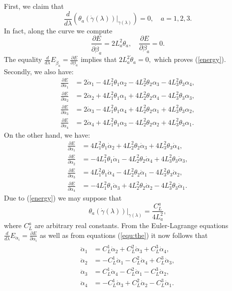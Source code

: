 \documentclass [12pt,a4paper]{amsart}
\theoremstyle{plain}
\theoremstyle{definition}
\numberwithin{equation}{section}
\begin{document}
First, we claim that 
\begin{equation}\label{energy}
\frac{d}{d\lambda}\left(\theta_a(\dot\gamma(\lambda))|_{\gamma(\lambda)}\right)=0,\quad a=1, 2, 3.
\end{equation} 
In fact, along the curve we compute 
$$
\frac{\partial E}{\partial {\dot\beta_{a}}}=2L_a^2\theta_a,\quad \frac{\partial E}{\partial \beta_{a}}=0.
$$
The equality  $\frac{d}{d\lambda}E_ {\dot\beta_{a}}=\frac{\partial E}{\partial \beta_{a}}$ implies that $2L_a^2\dot\theta_a=0,$ which proves (\ref{energy}).
Secondly, we also have:
\begin{align*}
\frac{\partial E}{\partial \dot\alpha_1}&=2\dot\alpha_1-4L_1^2\theta_1\alpha_2-4L_2^2\theta_2\alpha_3-4L_3^2\theta_3\alpha_4,\\
\frac{\partial E}{\partial \dot\alpha_2}&=2\dot\alpha_2+4L_1^2\theta_1\alpha_1+4L_2^2\theta_2\alpha_4-4L_3^2\theta_3\alpha_3,\\
\frac{\partial E}{\partial \dot\alpha_3}&=2\dot\alpha_3-4L_1^2\theta_1\alpha_4+4L_2^2\theta_2\alpha_1+4L_3^2\theta_3\alpha_2,\\
\frac{\partial E}{\partial \dot\alpha_4}&=2\dot\alpha_4+4L_1^2\theta_1\alpha_3-4L_2^2\theta_2\alpha_2+4L_3^2\theta_3\alpha_1.
\end{align*}
On the other hand, we have:
\begin{align*}
\frac{\partial E}{\partial {\alpha_1}}&=4L_1^2\theta_1\dot\alpha_2+4L_2^2\theta_2
\dot\alpha_3+4L_3^2\theta_3\dot\alpha_4,\\
\frac{\partial E}{\partial {\alpha_2}}&=-4L_1^2\theta_1\dot
\alpha_1-4L_2^2\theta_2\dot\alpha_4+
4L_3^2\theta_3\dot\alpha_3,\\
\frac{\partial E}{\partial {\alpha_3}}&=4L_1^2\theta_1\dot\alpha_4-
4L_2^2\theta_2\dot\alpha_1-4L_3^2\theta_3
\dot\alpha_2,\\
\frac{\partial E}{\partial {\alpha_4}}&=-4L_1^2\theta_1\dot\alpha_3
+4L_2^2\theta_2\dot\alpha_2-4L_3^2\theta_3
\dot\alpha_1.
\end{align*}
Due to (\ref{energy}) we may suppose that 
\begin{equation}\label{equ:the}
\theta_a(\dot\gamma(\lambda))|_{\gamma(\lambda)}=\frac{C_L^a}{4L_a^2},
\end{equation}
where $C_L^a$ are arbitrary real constants. From the Euler-Lagrange equations $\frac{d}{d\lambda}E_{\dot\alpha_i}=\frac{\partial E}{\partial \alpha_i}$ as well as from equations (\ref{equ:the}) it now follows that
\begin{align}\label{equ:ddgam}
\begin{split}
\ddot\alpha_1&=C_L^1\dot\alpha_2+C_L^2\dot
\alpha_3+C_L^3\dot\alpha_4,\\
\ddot\alpha_2&=-C_L^1\dot\alpha_1-C_L^2\dot\alpha_4+C_L^3\dot\alpha_3,\\
\ddot\alpha_3&=C_L^1\dot\alpha_4-C_L^2\dot\alpha_1-C_L^3\dot\alpha_2,\\
\ddot\alpha_4&=-C_L^1\dot\alpha_3+C_L^2\dot\alpha_2-C_L^3\dot\alpha_1.
\end{split}
\end{align} 
\end{document}
